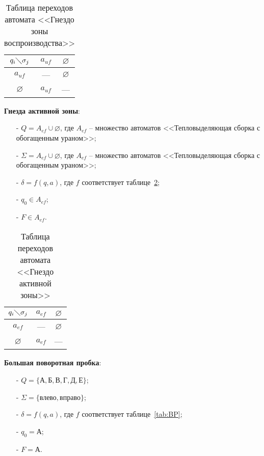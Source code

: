 \begin{table} [htbp]
  \centering
  \parbox{15cm}{\caption{Таблица переходов автомата <<Гнездо зоны воспроизводства>>}\label{tab:PlaceRes}}
  \begin{center}
  \begin{tabular}{| c | c | c |}
  \hline
  $q_i \diagdown \sigma_j$& $a_{uf}$ & $\varnothing$ \\
  \hline
  $a_{uf}$&  --- & $\varnothing$\\
  \hline
  $\varnothing$ & $a_{uf}$ & ---\\
  \hline
  \end{tabular}
  \end{center}
\end{table}

\textbf{Гнезда активной зоны}:
\begin{itemize}
 \item [-] $Q =  A_{ef} \cup \varnothing$, где $A_{ef}$ -- множество автоматов <<Тепловыделяющая сборка с обогащенным ураном>>;
 \item [-] $\Sigma =  A_{ef} \cup \varnothing$, где $A_{ef}$ -- множество автоматов <<Тепловыделяющая сборка с обогащенным ураном>>;
 \item [-] $\delta = f (q, a)$, где $f$ соответствует таблице~\ref{tab:PlaceAct};
 \item [-] $q_0 \in A_{ef} $;
 \item [-] $F \in A_{ef} $.
\end{itemize}

\begin{table} [htbp]
  \centering
  \parbox{15cm}{\caption{Таблица переходов автомата <<Гнездо активной зоны>>}\label{tab:PlaceAct}}
  \begin{center}
  \begin{tabular}{| c | c | c |}
  \hline
  $q_i \diagdown \sigma_j$& $a_{ef}$ & $\varnothing$ \\
  \hline
  $a_{ef}$&  --- & $\varnothing$\\
  \hline
  $\varnothing$ & $a_{ef}$ & ---\\
  \hline
  \end{tabular}
  \end{center}
\end{table}


\textbf{Большая поворотная пробка}:
\begin{itemize}
 \item [-] $Q = \{\text{А}, \text{Б}, \text{В}, \text{Г}, \text{Д}, \text{Е}\}$;
 \item [-] $\Sigma = \{\text{влево}, \text{вправо}\}$;
 \item [-] $\delta = f (q, a)$, где $f$ соответствует таблице~\ref{tab:BP};
 \item [-] $q_0 = \text{А}$;
 \item [-] $F = \text{А}$.
\end{itemize}

